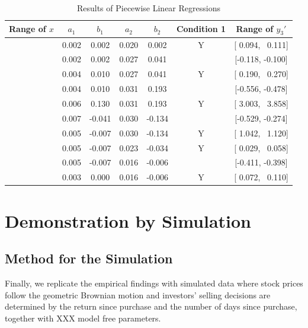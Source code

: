 \documentclass[11pt, a4paper]{article}
\begin{document}
\begin{table}[H] %
	\centering
	\caption{Results of Piecewise Linear Regressions}
	\label{table:segment}
	\begin{tabular}{ccccccc}
		\hline
		Range of $x$ & $a_1$ & $b_1$ & $a_2$ & $b_2$ & Condition 1 & Range of $y_3'$ \\ 
		\hline
		[-0.800, -0.171] & 0.002 &  0.002 & 0.020 &  0.002 & Y & [ 0.094, ~0.111] \\ \relax
		[-0.171, -0.130] & 0.002 &  0.002 & 0.027 &  0.041 &   & [-0.118, -0.100] \\ \relax
		[-0.130, -0.030] & 0.004 &  0.010 & 0.027 &  0.041 & Y & [ 0.190, ~0.270] \\ \relax
		[-0.030, -0.019] & 0.004 &  0.010 & 0.031 &  0.193 &   & [-0.556, -0.478] \\ \relax
		[-0.019, ~0.000] & 0.006 &  0.130 & 0.031 &  0.193 & Y & [ 3.003, ~3.858] \\ \relax
		[ 0.000, ~0.063] & 0.007 & -0.041 & 0.030 & -0.134 &   & [-0.529, -0.274] \\ \relax
		[ 0.063, ~0.069] & 0.005 & -0.007 & 0.030 & -0.134 & Y & [ 1.042, ~1.120] \\ \relax
		[ 0.069, ~0.248] & 0.005 & -0.007 & 0.023 & -0.034 & Y & [ 0.029, ~0.058] \\ \relax
		[ 0.248, ~0.291] & 0.005 & -0.007 & 0.016 & -0.006 &   & [-0.411, -0.398] \\ \relax
		[ 0.291, ~0.800] & 0.003 &  0.000 & 0.016 & -0.006 & Y & [ 0.072, ~0.110] \\ 
		\hline
	\end{tabular}
\end{table}




\section{Demonstration by Simulation}

\subsection{Method for the Simulation}
Finally, we replicate the empirical findings with simulated data where stock prices follow the geometric Brownian motion and investors' selling decisions are determined by the return since purchase and the number of days since purchase, together with XXX model free parameters.
\end{document}
